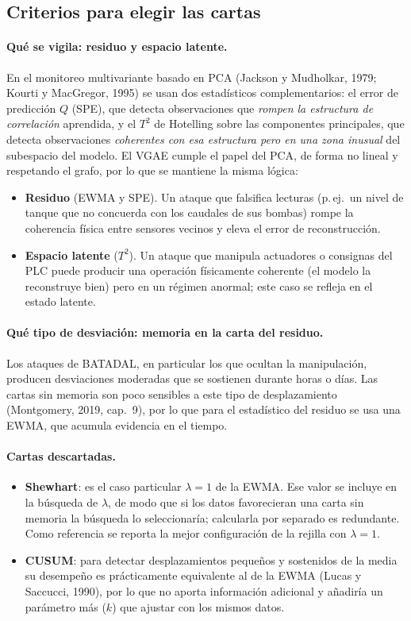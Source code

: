 \documentclass[11pt,a4paper]{article}
\begin{document}
\subsection{Criterios para elegir las cartas}

\paragraph{Qué se vigila: residuo y espacio latente.} En el monitoreo multivariante
basado en PCA (Jackson y Mudholkar, 1979; Kourti y MacGregor, 1995) se usan dos
estadísticos complementarios: el error de predicción $Q$ (SPE), que detecta
observaciones que \emph{rompen la estructura de correlación} aprendida, y el $T^2$ de
Hotelling sobre las componentes principales, que detecta observaciones
\emph{coherentes con esa estructura pero en una zona inusual} del subespacio del
modelo. El VGAE cumple el papel del PCA, de forma no lineal y respetando el grafo, por
lo que se mantiene la misma lógica:
\begin{itemize}
\item \textbf{Residuo} (EWMA y SPE). Un ataque que falsifica lecturas (p.\,ej.\ un
  nivel de tanque que no concuerda con los caudales de sus bombas) rompe la coherencia
  física entre sensores vecinos y eleva el error de reconstrucción.
\item \textbf{Espacio latente} ($T^2$). Un ataque que manipula actuadores o consignas
  del PLC puede producir una operación físicamente coherente (el modelo la reconstruye
  bien) pero en un régimen anormal; este caso se refleja en el estado latente.
\end{itemize}

\paragraph{Qué tipo de desviación: memoria en la carta del residuo.} Los ataques de
BATADAL, en particular los que ocultan la manipulación, producen desviaciones
moderadas que se sostienen durante horas o días. Las cartas sin memoria son poco
sensibles a este tipo de desplazamiento (Montgomery, 2019, cap.~9), por lo que para el
estadístico del residuo se usa una EWMA, que acumula evidencia en el tiempo.

\paragraph{Cartas descartadas.}
\begin{itemize}
\item \textbf{Shewhart}: es el caso particular $\lambda=1$ de la EWMA. Ese valor se
  incluye en la búsqueda de $\lambda$, de modo que si los datos favorecieran una carta
  sin memoria la búsqueda lo seleccionaría; calcularla por separado es redundante. Como
  referencia se reporta la mejor configuración de la rejilla con $\lambda=1$.
\item \textbf{CUSUM}: para detectar desplazamientos pequeños y sostenidos de la media
  su desempeño es prácticamente equivalente al de la EWMA (Lucas y Saccucci, 1990),
  por lo que no aporta información adicional y añadiría un parámetro más ($k$) que
  ajustar con los mismos datos.
\end{itemize}
\end{document}
